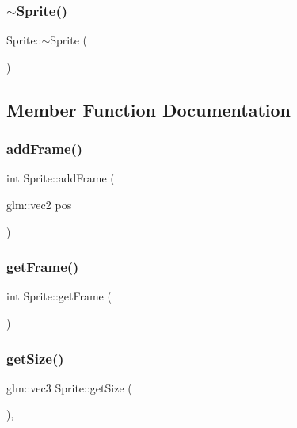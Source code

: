 \subsubsection{\texorpdfstring{$\sim$Sprite()}{~Sprite()}}
{\footnotesize\ttfamily Sprite\+::$\sim$\+Sprite (\begin{DoxyParamCaption}{ }\end{DoxyParamCaption})}



\subsection{Member Function Documentation}
\mbox{\label{classsage_1_1Sprite_a7444391256eab0cf1b7a994885026352}} 
\subsubsection{\texorpdfstring{addFrame()}{addFrame()}}
{\footnotesize\ttfamily int Sprite\+::add\+Frame (\begin{DoxyParamCaption}\item[{glm\+::vec2}]{pos }\end{DoxyParamCaption})}

\mbox{\label{classsage_1_1Sprite_af7d9465b0ef867d23cbb587b6c7b6b13}} 
\subsubsection{\texorpdfstring{getFrame()}{getFrame()}}
{\footnotesize\ttfamily int Sprite\+::get\+Frame (\begin{DoxyParamCaption}{ }\end{DoxyParamCaption})}

\mbox{\label{classsage_1_1Sprite_a4fbebafc74986ae399360118796dd069}} 
\subsubsection{\texorpdfstring{getSize()}{getSize()}}
{\footnotesize\ttfamily glm\+::vec3 Sprite\+::get\+Size (\begin{DoxyParamCaption}{ }\end{DoxyParamCaption})\hspace{0.3cm}{\ttfamily [override]}, {\ttfamily [virtual]}}



